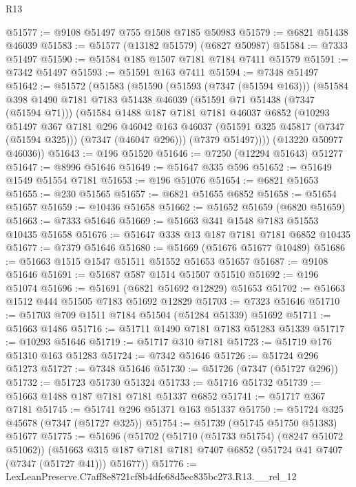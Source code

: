 \begin{lexlean}{R13}
\begin{coremodule}
@51577 := @9108 @51497 @755 @1508 @7185 @50983
@51579 := @6821 @51438 @46039
@51583 := @51577 (@13182 @51579) (@6827 @50987)
@51584 := @7333 @51497
@51590 := @51584 @185 @1507 @7181 @7184 @7411 @51579
@51591 := @7342 @51497
@51593 := @51591 @163 @7411
@51594 := @7348 @51497
@51642 := @51572
    (@51583
      (@51590
        (@51593 (@7347 (@51594 @163)))
        (@51584
          @398
          @1490
          @7181
          @7183
          @51438
          @46039
          (@51591 @71 @51438 (@7347 (@51594 @71)))
          (@51584
            @1488
            @187
            @7181
            @7181
            @46037
            @6852
            (@10293
              @51497
              @367
              @7181
              @296
              @46042
              @163
              @46037
              (@51591 @325 @45817 (@7347 (@51594 @325)))
              (@7347 (@46047 @296)))
            (@7379 @51497))))
      (@13220 @50977 @46036))
@51643 := @196 @51520
@51646 := @7250 (@12294 @51643) @51277
@51647 := @8996 @51646
@51649 := @51647 @335 @596
@51652 := @51649 @1549 @51554 @7181
@51653 := @196 @51076
@51654 := @6821 @51653
@51655 := @230 @51565
@51657 := @6821 @51655 @6852
@51658 := @51654 @51657
@51659 := @10436 @51658
@51662 := @51652 @51659 (@6820 @51659)
@51663 := @7333 @51646
@51669 := @51663 @341 @1548 @7183 @51553 @10435 @51658
@51676 := @51647 @338 @13 @187 @7181 @7181 @6852 @10435
@51677 := @7379 @51646
@51680 := @51669 (@51676 @51677 @10489)
@51686 := @51663 @1515 @1547 @51511 @51552 @51653 @51657
@51687 := @9108 @51646
@51691 := @51687 @587 @1514 @51507 @51510
@51692 := @196 @51074
@51696 := @51691 (@6821 @51692 @12829) @51653
@51702 := @51663 @1512 @444 @51505 @7183 @51692 @12829
@51703 := @7323 @51646
@51710 := @51703 @709 @1511 @7184 @51504 (@51284 @51339) @51692
@51711 := @51663 @1486
@51716 := @51711 @1490 @7181 @7183 @51283 @51339
@51717 := @10293 @51646
@51719 := @51717 @310 @7181
@51723 := @51719 @176 @51310 @163 @51283
@51724 := @7342 @51646
@51726 := @51724 @296 @51273
@51727 := @7348 @51646
@51730 := @51726 (@7347 (@51727 @296))
@51732 := @51723 @51730 @51324
@51733 := @51716 @51732
@51739 := @51663 @1488 @187 @7181 @7181 @51337 @6852
@51741 := @51717 @367 @7181
@51745 := @51741 @296 @51371 @163 @51337
@51750 := @51724 @325 @45678 (@7347 (@51727 @325))
@51754 := @51739 (@51745 @51750 @51383) @51677
@51775 := @51696
    (@51702
      (@51710 (@51733 @51754) (@8247 @51072 @51062))
      (@51663 @315 @187 @7181 @7181 @7407 @6852 (@51724 @41 @7407 (@7347 (@51727 @41))) @51677))
@51776 := LexLeanPreserve.C7aff8e8721cf8b4dfe68d5ec835bc273.R13.__rel_12

\end{coremodule}
\end{lexlean}
